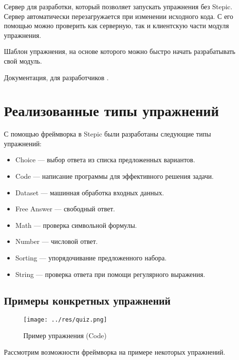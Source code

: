 \documentclass{matmex-diploma-custom}
\begin{document}
Сервер для разработки, который позволяет запускать упражнения без
Stepic. Сервер автоматически перезагружается при изменении исходного
кода. С его помощью можно проверить как серверную, так и клиентскую
части модуля упражнения.

Шаблон упражнения, на основе которого можно быстро начать
разрабатывать свой модуль.

Документация, для разработчиков \cite{plugins:doc}.

\section{Реализованные типы упражнений}

С помощью фреймворка в Stepic были разработаны следующие типы упражнений:
\begin{itemize}
\item Choice --- выбор ответа из списка предложенных вариантов.
\item Code --- написание программы для эффективного решения задачи.
\item Dataset --- машинная обработка входных данных.
\item Free Answer --- свободный ответ.
\item Math --- проверка символьной формулы.
\item Number --- числовой ответ.
\item Sorting --- упорядочивание предложенного набора.
\item String --- проверка ответа при помощи регулярного выражения.
\end{itemize}

\subsection{Примеры конкретных упражнений}
\begin{figure}
  \texttt{[image: ../res/quiz.png]}
  \caption{Пример упражнения (Code)}
\end{figure}

Рассмотрим возможности фреймворка на примере некоторых упражнений.
\end{document}
